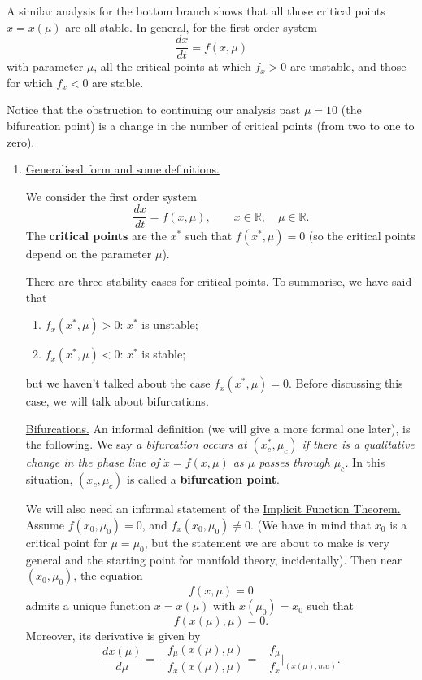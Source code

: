 \documentclass[11pt, letterpaper, oneside]{article}     %
\numberwithin{equation}{subsection}
\theoremstyle{definition}
\numberwithin{theorem}{section}
\theoremstyle{remark}
\newcommand{\RR}{\mathbb{R}}
\begin{document}
A similar analysis for the bottom branch shows that all those critical points $x=x(\mu)$ are all stable. In general, for the first order system
\begin{equation}
  \frac{dx}{dt} = f(x,\mu)
\end{equation}
with parameter $\mu$, all the critical points at which $f_x > 0$ are unstable, and those for which $f_x < 0$ are stable.

Notice that the obstruction to continuing our analysis past $\mu = 10$ (the bifurcation point) is a change in the number of critical points (from two to one to zero).

\begin{enumerate}
\item \underline{Generalised form and some definitions.}

  We consider the first order system
  \begin{equation}\label{eq:bifurcations-system}
    \frac{dx}{dt} = f(x,\mu),\quad\quad x\in \RR,\quad\mu\in\RR.
  \end{equation}
  The \textbf{critical points} are the $x^*$ such that $f(x^*,\mu) = 0$ (so the critical points depend on the parameter $\mu$).

  There are three stability cases for critical points. To summarise, we have said that
  \begin{enumerate}
  \item $f_x(x^*,\mu)>0$: $x^*$ is unstable;
  \item $f_x(x^*,\mu)<0$: $x^*$ is stable;
  \end{enumerate}
  but we haven't talked about the case $f_x(x^*,\mu)=0$. Before discussing this case, we will talk about bifurcations.

  \underline{Bifurcations.} An informal definition (we will give a more formal one later), is the following. We say \emph{a bifurcation occurs at $(x^*_c,\mu_c)$ if there is a qualitative change in the phase line of $\dot x = f(x,\mu)$ as $\mu$ passes through $\mu_c$.} In this situation, $(x_c,\mu_c)$ is called a \textbf{bifurcation point}.

  We will also need an informal statement of the \underline{Implicit Function Theorem.} Assume $f(x_0,\mu_0) = 0$, and $f_x(x_0,\mu_0) \neq 0$. (We have in mind that $x_0$ is a critical point for $\mu = \mu_0$, but the statement we are about to make is very general and the starting point for manifold theory, incidentally). Then near $(x_0,\mu_0)$, the equation
  \begin{equation}
    f(x,\mu) = 0
  \end{equation}
  admits a unique function $x = x(\mu)$ with $x(\mu_0) = x_0$ such that
  \begin{equation}
    f(x(\mu),\mu) = 0.
  \end{equation}
  Moreover, its derivative is given by
  \begin{equation}\label{eq:implicit-fn-derivative}
    \frac{dx(\mu)}{d\mu} = -\frac{f_\mu(x(\mu),\mu)}{f_x(x(\mu),\mu)} = -\frac{f_\mu}{f_x}\bigg|_{(x(\mu),mu)}.
  \end{equation}


\end{enumerate}
\end{document}
